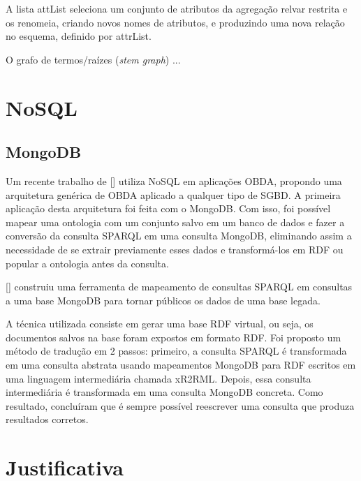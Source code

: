 A lista attList seleciona um conjunto de atributos da agregação relvar restrita
e os renomeia, criando novos nomes de atributos, e produzindo uma nova relação
no esquema, definido por attrList.


O grafo de termos/raízes (\textit{stem graph}) ... %



\section{NoSQL}
\label{sec:nosql}



\subsection{MongoDB}
\label{ssec:mongodb}

Um recente trabalho de [] utiliza NoSQL em aplicações OBDA,
propondo uma arquitetura genérica de OBDA aplicado a qualquer tipo de SGBD.
A primeira aplicação desta arquitetura foi feita com o MongoDB. Com isso,
foi possível mapear uma ontologia com um conjunto salvo em um banco de dados
e fazer a conversão da consulta SPARQL em uma consulta MongoDB, eliminando
assim a necessidade de se extrair previamente esses dados e transformá-los
em RDF ou popular a ontologia antes da consulta.

[] construiu uma ferramenta de mapeamento de
consultas SPARQL em consultas a uma base MongoDB para tornar públicos os dados
de uma base legada.

A técnica utilizada consiste em gerar uma base RDF virtual, ou seja, os
documentos salvos na base foram expostos em formato RDF. Foi proposto um
método de tradução em 2 passos: primeiro, a consulta SPARQL é transformada em
uma consulta abstrata usando mapeamentos MongoDB para RDF escritos em uma
linguagem intermediária chamada xR2RML. Depois, essa consulta intermediária
é transformada em uma consulta MongoDB concreta. Como resultado,
concluíram que é sempre possível reescrever uma consulta que produza resultados
corretos.


\section{Justificativa}
\label{sec:justificativa}

